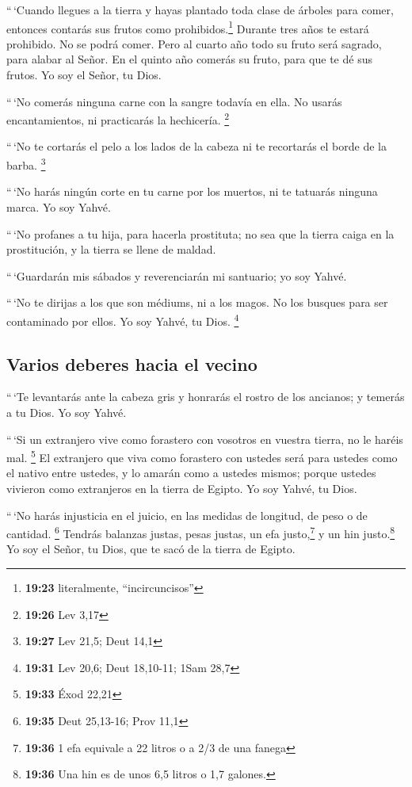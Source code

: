  ``\,`Cuando llegues a la tierra y hayas plantado toda
clase de árboles para comer, entonces contarás sus frutos como
prohibidos.\footnote{\textbf{19:23} literalmente, ``incircuncisos''}
Durante tres años te estará prohibido. No se podrá comer.
 Pero al cuarto año todo su fruto será sagrado, para
alabar al Señor.  En el quinto año comerás su fruto, para
que te dé sus frutos. Yo soy el Señor, tu Dios.

 ``\,`No comerás ninguna carne con la sangre todavía en
ella. No usarás encantamientos, ni practicarás la hechicería.
\footnote{\textbf{19:26} Lev 3,17}

 ``\,`No te cortarás el pelo a los lados de la cabeza ni
te recortarás el borde de la barba. \footnote{\textbf{19:27} Lev 21,5;
  Deut 14,1}

 ``\,`No harás ningún corte en tu carne por los muertos,
ni te tatuarás ninguna marca. Yo soy Yahvé.

 ``\,`No profanes a tu hija, para hacerla prostituta; no
sea que la tierra caiga en la prostitución, y la tierra se llene de
maldad.

 ``\,`Guardarán mis sábados y reverenciarán mi santuario;
yo soy Yahvé.

 ``\,`No te dirijas a los que son médiums, ni a los
magos. No los busques para ser contaminado por ellos. Yo soy Yahvé, tu
Dios. \footnote{\textbf{19:31} Lev 20,6; Deut 18,10-11; 1Sam 28,7}

\hypertarget{varios-deberes-hacia-el-vecino}{%
\subsection{Varios deberes hacia el
vecino}\label{varios-deberes-hacia-el-vecino}}

 ``\,`Te levantarás ante la cabeza gris y honrarás el
rostro de los ancianos; y temerás a tu Dios. Yo soy Yahvé.

 ``\,`Si un extranjero vive como forastero con vosotros
en vuestra tierra, no le haréis mal. \footnote{\textbf{19:33} Éxod 22,21}
 El extranjero que viva como forastero con ustedes será
para ustedes como el nativo entre ustedes, y lo amarán como a ustedes
mismos; porque ustedes vivieron como extranjeros en la tierra de Egipto.
Yo soy Yahvé, tu Dios.

 ``\,`No harás injusticia en el juicio, en las medidas de
longitud, de peso o de cantidad. \footnote{\textbf{19:35} Deut 25,13-16;
  Prov 11,1}  Tendrás balanzas justas, pesas justas, un
efa justo,\footnote{\textbf{19:36} 1 efa equivale a 22 litros o a 2/3 de
  una fanega} y un hin justo.\footnote{\textbf{19:36} Una hin es de unos
  6,5 litros o 1,7 galones.} Yo soy el Señor, tu Dios, que te sacó de la
tierra de Egipto.

